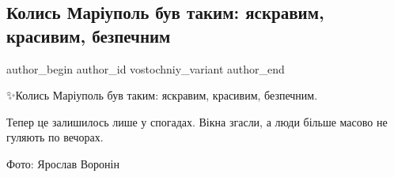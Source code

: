  
 
 
 
 

\subsection{Колись Маріуполь був таким: яскравим, красивим, безпечним}
\label{sec:21_02_2023.fb.vostochniy_variant.1.kolis_mar_upol_buv_t}

\ifcmt
 author_begin
   author_id vostochniy_variant
 author_end
\fi

✨Колись Маріуполь був таким: яскравим, красивим, безпечним.

Тепер це залишилось лише у спогадах. Вікна згасли, а люди більше масово не гуляють по вечорах.

Фото: Ярослав Воронін
